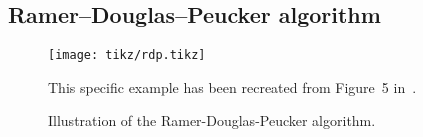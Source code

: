 \subsection{Ramer–Douglas–Peucker algorithm}

\begin{figure}
  \centering
  \texttt{[image: tikz/rdp.tikz]}
  \caption{%
    Illustration of the Ramer-Douglas-Peucker algorithm.
  }{%
    This specific example has been recreated from Figure~5 in~\cite{original-rdp-figure}.
  }
  \label{}
\end{figure}
